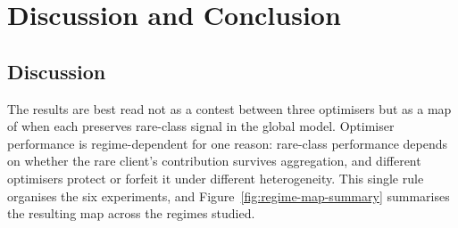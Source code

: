 \documentclass[11pt,a4paper]{report}
\begin{document}










\chapter{Discussion and Conclusion}
\label{ch:discussion}

\section{Discussion}
\label{sec:disc}

The results are best read not as a contest between three optimisers but as a map
of when each preserves rare-class signal in the global model. Optimiser
performance is regime-dependent for one reason: rare-class performance depends on
whether the rare client's contribution survives aggregation, and different
optimisers protect or forfeit it under different heterogeneity. This single rule
organises the six experiments, and Figure~\ref{fig:regime-map-summary} summarises
the resulting map across the regimes studied.
\end{document}
